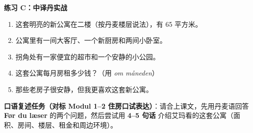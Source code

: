 \textbf{练习 C：中译丹实战}
\begin{enumerate}
  \item 这套明亮的新公寓在二楼（按丹麦楼层说法），有 65 平方米。
  \item 公寓里有一间大客厅、一个新厨房和两间小卧室。
  \item 拐角处有一家便宜的超市和一个安静的小公园。
  \item 这套公寓每月房租多少钱？（用 \textit{om måneden}）
  \item 那些老房子很安静，但我更喜欢这套新公寓。
\end{enumerate}


\textbf{口语复述任务（对标 Modul 1--2 住房口试表达）}：请合上课文，先用丹麦语回答 \textbf{Før du læser} 的两个问题，然后尝试用 \textbf{4--5 句话} 介绍艾玛看的这套公寓（面积、房间、楼层、租金和周边环境）。

